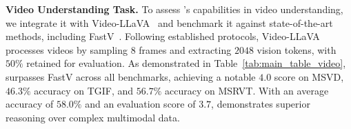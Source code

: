 \textbf{Video Understanding Task.}  
To assess \algname's capabilities in video understanding, we integrate it with Video-LLaVA~\citep{lin2023video} and benchmark it against state-of-the-art methods, including FastV~\citep{chen2024image}. Following established protocols, Video-LLaVA processes videos by sampling $8$ frames and extracting $2048$ vision tokens, with $50\%$ retained for evaluation. As demonstrated in Table~\ref{tab:main_table_video}, \algname surpasses FastV across all benchmarks, achieving a notable $4.0$ score on MSVD, $46.3\%$ accuracy on TGIF, and $56.7\%$ accuracy on MSRVT. With an average accuracy of $58.0\%$ and an evaluation score of $3.7$, \algname 
demonstrates superior reasoning over complex multimodal data.%

% 

% 










